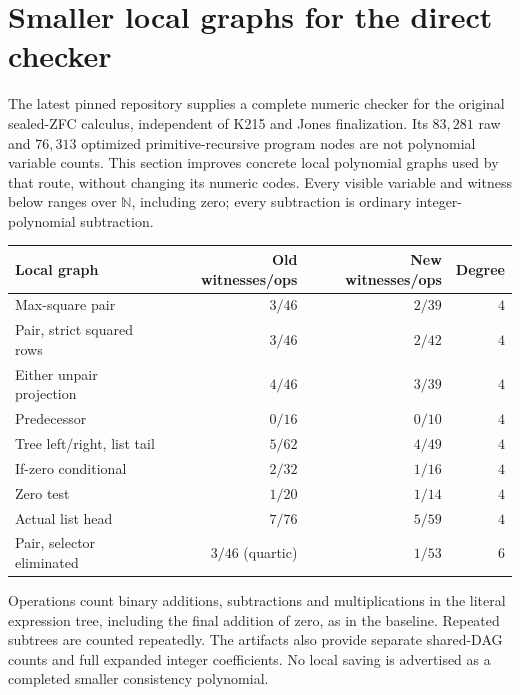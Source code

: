 \section{Smaller local graphs for the direct checker}
\label{sec:direct-local-wave11}

The latest pinned repository supplies a complete numeric checker for the
original sealed-ZFC calculus, independent of K215 and Jones finalization.
Its $83{,}281$ raw and $76{,}313$ optimized primitive-recursive program nodes
are not polynomial variable counts.  This section improves concrete local
polynomial graphs used by that route, without changing its numeric codes.
Every visible variable and witness below ranges over $\mathbb N$, including
zero; every subtraction is ordinary integer-polynomial subtraction.

\begin{center}
\begin{tabular}{lrrr}
\hline
Local graph & Old witnesses/ops & New witnesses/ops & Degree\\
\hline
Max-square pair & $3/46$ & $2/39$ & $4$\\
Pair, strict squared rows & $3/46$ & $2/42$ & $4$\\
Either unpair projection & $4/46$ & $3/39$ & $4$\\
Predecessor & $0/16$ & $0/10$ & $4$\\
Tree left/right, list tail & $5/62$ & $4/49$ & $4$\\
If-zero conditional & $2/32$ & $1/16$ & $4$\\
Zero test & $1/20$ & $1/14$ & $4$\\
Actual list head & $7/76$ & $5/59$ & $4$\\
Pair, selector eliminated & $3/46$ (quartic) & $1/53$ & $6$\\
\hline
\end{tabular}
\end{center}
Operations count binary additions, subtractions and multiplications in the
literal expression tree, including the final addition of zero, as in the
baseline.  Repeated subtrees are counted repeatedly.  The artifacts also
provide separate shared-DAG counts and full expanded integer coefficients.
No local saving is advertised as a completed smaller consistency polynomial.

